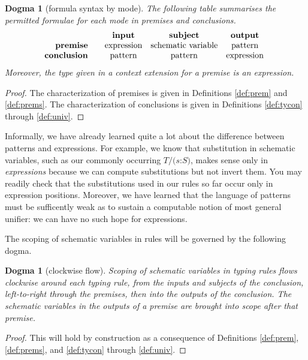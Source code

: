 \documentclass{jfp1}
\newtheorem{dogma}[theorem]{Dogma}
\newcommand{\fsl}{\texttt{/}}
\newcommand{\Pa}[1]{\texttt{(}#1\texttt{)}}
\newcommand{\hb}{\texttt{:}}
\newcommand{\ra}[2]{\Pa{#1 \hb #2}}
\begin{document}
\begin{dogma}[\label{dogma:mode}formula syntax by mode]
  The following table summarises the permitted formulae for each mode in premises
  and conclusions.
  \[\mbox{\begin{tabular}{r@{~ ~}@{~ ~}c@{~ ~}c@{~ ~}c}
                    & \textbf{input} & \textbf{subject} & \textbf{output} \\
            \textbf{premise}  & expression & schematic variable & pattern \\
     \textbf{conclusion} & pattern & pattern & expression \\
          \end{tabular} }\]
  Moreover, the type given in a context extension for a premise is an expression.
\end{dogma}
\begin{proof}
  The characterization of premises is given in Definitions
  \ref{def:prem} and \ref{def:prems}. The characterization of
  conclusions is given in Definitions \ref{def:tycon} through \ref{def:univ}.
\end{proof}

Informally, we have already learned quite a lot about the difference
between patterns and expressions. For example, we know that
substitution in schematic variables, such as our commonly occurring
$T\fsl\ra sS$, makes sense only in \emph{expressions} because we
can compute substitutions but not invert them. You may readily check
that the substitutions used in our rules so far occur only in
expression positions. Moreover, we have learned that the language of
patterns must be sufficently weak as to sustain a computable notion of
most general unifier: we can have no such hope for expressions.

The scoping of schematic variables in rules will be governed by the
following dogma.

\begin{dogma}[clockwise flow\label{dogma:clockwise}]
  Scoping of schematic variables in typing rules flows clockwise
  around each typing rule, from the inputs and subjects of the
  conclusion, left-to-right through the premises, then into the
  outputs of the conclusion. The schematic variables in the outputs
  of a premise are brought into scope after that premise.
\end{dogma}
\begin{proof}
  This will hold by construction as a consequence of Definitions
  \ref{def:prem}, \ref{def:prems}, and  \ref{def:tycon} through \ref{def:univ}.
\end{proof}
\end{document}
